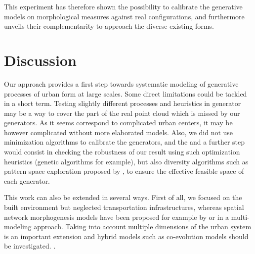 \documentclass[letterpaper]{article}
\begin{document}
This experiment has therefore shown the possibility to calibrate the generative models on morphological measures against real configurations, and furthermore unveils their complementarity to approach the diverse existing forms.









\section{Discussion} \label{sec:discussion}


Our approach provides a first step towards systematic modeling of generative processes of urban form at large scales. Some direct limitations could be tackled in a short term. Testing slightly different processes and heuristics in generator may be a way to cover the part of the real point cloud which is missed by our generators. As it seems correspond to complicated urban centers, it may be however complicated without more elaborated models. Also, we did not use minimization algorithms to calibrate the generators, and the and a further step would consist in checking the robustness of our result using such optimization heuristics (genetic algorithms for example), but also diversity algorithms such as pattern space exploration proposed by \cite{10.1371/journal.pone.0138212}, to ensure the effective feasible space of each generator. 


This work can also be extended in several ways. First of all, we focused on the built environment but neglected transportation infrastructures, whereas spatial network morphogenesis models have been proposed for example by \cite{courtat2011mathematics} or \cite{raimbault2018multi} in a multi-modeling approach.
Taking into account multiple dimensions of the urban system is an important extension and hybrid models such as co-evolution models \citep{raimbault2014hybrid} should be investigated.
\citep{le2015forme}.\cite{brasebin2017apports}
\end{document}
